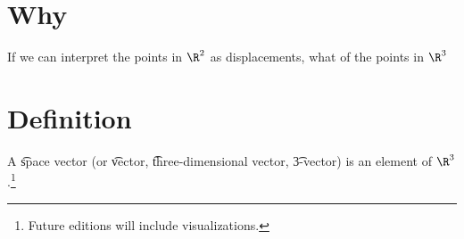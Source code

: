 

\section*{Why}

If we can interpret the points in $\R ^2$ as displacements, what of the points in $\R ^3$

\section*{Definition}

A \t{space vector} (or \t{vector}, \t{three-dimensional vector}, \t{3-vector}) is an element of $\R ^3$.\footnote{Future editions will include visualizations.}

\blankpage